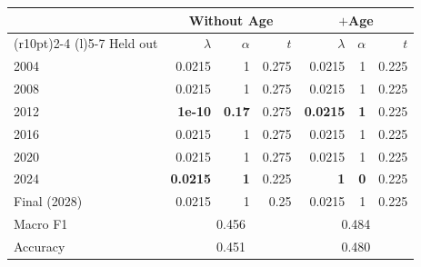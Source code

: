 \begin{tabular}{lrrr@{\hspace{10pt}}rrr}
\toprule
& \multicolumn{3}{c}{\textbf{Without Age}} & \multicolumn{3}{c}{\textbf{$+$Age}} \\
\cmidrule(r{10pt}){2-4} \cmidrule(l){5-7}
Held out & $\lambda$ & $\alpha$ & $t$ & $\lambda$ & $\alpha$ & $t$ \\
\midrule
2004 & 0.0215 & 1 & 0.275 & 0.0215 & 1 & 0.225 \\
2008 & 0.0215 & 1 & 0.275 & 0.0215 & 1 & 0.225 \\
2012 & \textbf{1e-10} & \textbf{0.17} & 0.275 & \textbf{0.0215} & \textbf{1} & 0.225 \\
2016 & 0.0215 & 1 & 0.275 & 0.0215 & 1 & 0.225 \\
2020 & 0.0215 & 1 & 0.275 & 0.0215 & 1 & 0.225 \\
2024 & \textbf{0.0215} & \textbf{1} & 0.225 & \textbf{1} & \textbf{0} & 0.225 \\
\midrule
Final (2028) & 0.0215 & 1 & 0.25 & 0.0215 & 1 & 0.225 \\
\midrule
Macro F1 & \multicolumn{3}{c}{0.456} & \multicolumn{3}{c}{0.484} \\
Accuracy & \multicolumn{3}{c}{0.451} & \multicolumn{3}{c}{0.480} \\
\bottomrule
\end{tabular}
